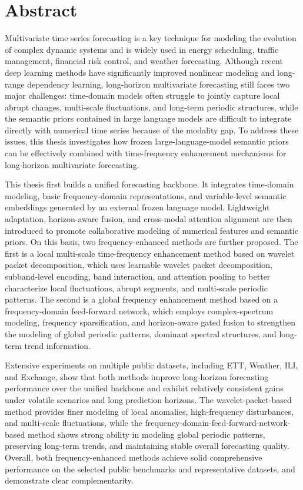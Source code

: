 \chapter{Abstract} Multivariate time series forecasting is a key technique for modeling the evolution of complex dynamic systems and is widely used in energy scheduling, traffic management, financial risk control, and weather forecasting. Although recent deep learning methods have significantly improved nonlinear modeling and long-range dependency learning, long-horizon multivariate forecasting still faces two major challenges: time-domain models often struggle to jointly capture local abrupt changes, multi-scale fluctuations, and long-term periodic structures, while the semantic priors contained in large language models are difficult to integrate directly with numerical time series because of the modality gap. To address these issues, this thesis investigates how frozen large-language-model semantic priors can be effectively combined with time-frequency enhancement mechanisms for long-horizon multivariate forecasting.

This thesis first builds a unified forecasting backbone. It integrates time-domain modeling, basic frequency-domain representations, and variable-level semantic embeddings generated by an external frozen language model. Lightweight adaptation, horizon-aware fusion, and cross-modal attention alignment are then introduced to promote collaborative modeling of numerical features and semantic priors. On this basis, two frequency-enhanced methods are further proposed. The first is a local multi-scale time-frequency enhancement method based on wavelet packet decomposition, which uses learnable wavelet packet decomposition, subband-level encoding, band interaction, and attention pooling to better characterize local fluctuations, abrupt segments, and multi-scale periodic patterns. The second is a global frequency enhancement method based on a frequency-domain feed-forward network, which employs complex-spectrum modeling, frequency sparsification, and horizon-aware gated fusion to strengthen the modeling of global periodic patterns, dominant spectral structures, and long-term trend information.

Extensive experiments on multiple public datasets, including ETT, Weather, ILI, and Exchange, show that both methods improve long-horizon forecasting performance over the unified backbone and exhibit relatively consistent gains under volatile scenarios and long prediction horizons. The wavelet-packet-based method provides finer modeling of local anomalies, high-frequency disturbances, and multi-scale fluctuations, while the frequency-domain-feed-forward-network-based method shows strong ability in modeling global periodic patterns, preserving long-term trends, and maintaining stable overall forecasting quality. Overall, both frequency-enhanced methods achieve solid comprehensive performance on the selected public benchmarks and representative datasets, and demonstrate clear complementarity.

